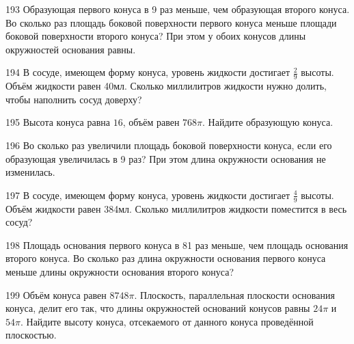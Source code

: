 \documentclass[a4paper]{article}
\begin{document}
\begin{taskBN}{193}
Образующая первого конуса в 9 раз меньше, чем образующая второго конуса. Во сколько раз площадь боковой поверхности первого конуса меньше площади боковой поверхности второго конуса? При этом у обоих конусов длины окружностей основания равны.
\end{taskBN}

\begin{taskBN}{194}
В сосуде, имеющем форму конуса, уровень жидкости достигает $\frac{2}{9}$ высоты. Объём жидкости равен 40мл. Сколько миллилитров жидкости нужно долить, чтобы наполнить сосуд доверху?
\end{taskBN}

\begin{taskBN}{195}
Высота конуса равна $16$, объём равен $768\pi$. Найдите образующую конуса. 
\end{taskBN}

\begin{taskBN}{196}
Во сколько раз увеличили площадь боковой поверхности конуса, если его образующая увеличилась в 9 раз? При этом длина окружности основания не изменилась.
\end{taskBN}

\begin{taskBN}{197}
В сосуде, имеющем форму конуса, уровень жидкости достигает $\frac{4}{9}$ высоты. Объём жидкости равен 384мл. Сколько миллилитров жидкости поместится в весь сосуд?
\end{taskBN}

\begin{taskBN}{198}
Площадь основания первого конуса в 81 раз меньше, чем площадь основания второго конуса. Во сколько раз длина окружности основания первого конуса меньше длины окружности основания второго конуса?
\end{taskBN}

\begin{taskBN}{199}
Объём конуса равен $8748\pi$. Плоскость, параллельная плоскости основания конуса,  делит его так, что длины окружностей оснований конусов равны $24\pi$ и $54\pi$. Найдите высоту конуса, отсекаемого от данного конуса проведённой плоскостью. 
\end{taskBN}
\end{document}
